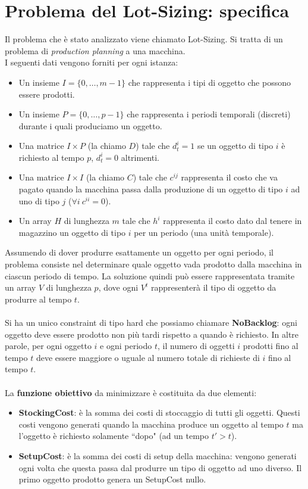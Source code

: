 \documentclass[12pt]{article}
\begin{document}
\section*{Problema del Lot-Sizing: specifica}
Il problema che è stato analizzato viene chiamato Lot-Sizing. Si tratta di un problema di \textit{production planning} a una macchina.\\
I seguenti dati vengono forniti per ogni istanza:
\begin{itemize}
\item Un insieme $I=\{0,\dots,m-1\}$ che rappresenta i tipi di oggetto che possono essere prodotti.
\item Un insieme $P=\{0,\dots,p-1\}$ che rappresenta i periodi temporali (discreti) durante i quali produciamo un oggetto.
\item Una matrice $I\times P$ (la chiamo $D$) tale che $d^i_t=1$ se un oggetto di tipo $i$ è richiesto al tempo $p$, $d^i_t=0$ altrimenti.
\item Una matrice $I\times I$ (la chiamo $C$) tale che $c^{ij}$ rappresenta il costo che va pagato quando la macchina passa dalla produzione di un oggetto di tipo $i$ ad uno di tipo $j$ ($\forall i\ c^{ii}=0$).
\item Un array $H$ di lunghezza $m$ tale che $h^i$ rappresenta il costo dato dal tenere in magazzino un oggetto di tipo $i$ per un periodo (una unità temporale).
\end{itemize}
Assumendo di dover produrre esattamente un oggetto per ogni periodo, il problema consiste nel determinare quale oggetto vada prodotto dalla macchina in ciascun periodo di tempo. La soluzione quindi può essere rappresentata tramite un array $V$ di lunghezza $p$, dove ogni $V^t$ rappresenterà il tipo di oggetto da produrre al tempo $t$.\\\\
Si ha un unico constraint di tipo hard che possiamo chiamare \textbf{NoBacklog}: ogni oggetto deve essere prodotto non più tardi rispetto a quando è richiesto. In altre parole, per ogni oggetto $i$ e ogni periodo $t$, il numero di oggetti $i$ prodotti fino al tempo $t$ deve essere maggiore o uguale al numero totale di richieste di $i$ fino al tempo $t$.\\\\
La \textbf{funzione obiettivo} da minimizzare è costituita da due elementi:
\begin{itemize}
\item \textbf{StockingCost}: è la somma dei costi di stoccaggio di tutti gli oggetti. Questi costi vengono generati quando la macchina produce un oggetto al tempo $t$ ma l'oggetto è richiesto solamente ``dopo" (ad un tempo $t'>t$).
\item \textbf{SetupCost}: è la somma dei costi di setup della macchina: vengono generati ogni volta che questa passa dal produrre un tipo di oggetto ad uno diverso. Il primo oggetto prodotto genera un SetupCost nullo.
\end{itemize}
\end{document}
